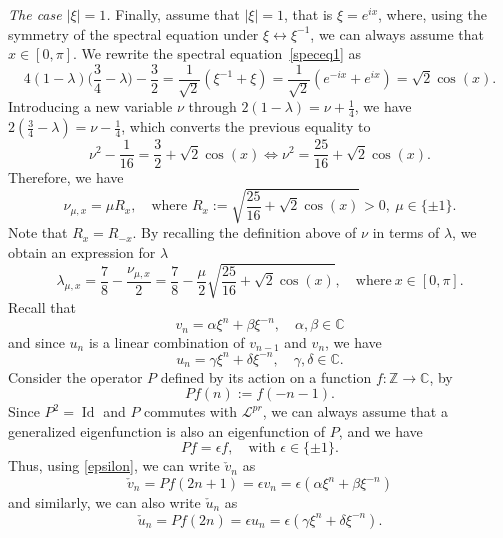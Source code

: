 \documentclass[11pt]{amsart}
\newcommand{\Z}{\mathbb{Z}}
\newcommand{\C}{\mathbb{C}}
\theoremstyle{definition}
\theoremstyle{remark}
\theoremstyle{plain}
\numberwithin{equation}{section}
\numberwithin{lemma}{section}
\numberwithin{definition}{section}
\numberwithin{proposition}{section}
\numberwithin{corollary}{section}
\numberwithin{theorem}{section}
\numberwithin{remark}{section}
\begin{document}
\vskip 0.3cm
{\it The case $\vert \xi \vert=1$.}
Finally, assume that $\vert \xi \vert=1$, that is $\xi=e^{ix}$, where, using the symmetry of the spectral equation under $\xi \leftrightarrow \xi^{-1}$, we can always assume that $x\in[0,\pi]$. We rewrite the spectral equation~\eqref{speceq1} as 
$$
4(1-\lambda)\Big(\frac{3}{4}-\lambda\Big)-\frac{3}{2}=\frac{1}{\sqrt{2}}(\xi^{-1}+\xi)=\frac{1}{\sqrt{2}}(e^{-ix}+e^{ix})=\sqrt{2}\cos(x).
$$
Introducing a new variable $\nu$ through $2(1-\lambda)=\nu+\frac{1}{4}$, we have $2(\frac{3}{4}-\lambda)=\nu-\frac{1}{4}$, which converts the previous equality to
\begin{equation}\label{mu1}
 \nu^2-\frac{1}{16}=\frac{3}{2}+\sqrt{2}\cos(x)
\iff
\nu^2=\frac{25}{16}+\sqrt{2}\cos(x).
\end{equation}
Therefore, we have 
\begin{equation}
 \nu_{\mu,x}=\mu R_x, \quad \text{where } R_x:=\sqrt{\frac{25}{16}+\sqrt{2}\cos(x)}>0, \ \mu\in\{\pm 1\}.
\end{equation}
Note that $R_x=R_{-x}$. By recalling the definition above of $\nu$ in terms of $\lambda$, we obtain an expression for $\lambda$
$$
\lambda_{\mu,x}=\frac{7}{8}-\frac{\nu_{\mu,x}}{2}=\frac{7}{8}-\frac{\mu}{2}\sqrt{\frac{25}{16}+\sqrt{2}\cos(x)}, \quad \text{where} \ x\in[0,\pi].
$$
Recall that 
\begin{equation}\label{newv}
 v_n=\alpha \xi^n + \beta \xi^{-n}, \quad \alpha,\beta\in\C
\end{equation}
and since $u_n$ is a linear combination of $v_{n-1}$ and $v_n$, we have
\begin{equation}\label{newu}
 u_n=\gamma \xi^n + \delta \xi^{-n}, \quad \gamma,\delta\in\C.
\end{equation}
Consider the operator $P$ defined by its action on a function $f:\Z \to \C$, by 
$$
Pf(n):=f(-n-1).
$$
Since $P^2=\operatorname{Id}$ and $P$ commutes with $\mathcal{L}^{pr}$, we can always assume that a generalized eigenfunction is also an eigenfunction of $P$, and we have 
\begin{equation}
 Pf=\epsilon f, \quad \text{with } \epsilon\in\{\pm1\}. \label{epsilon}
\end{equation}
Thus, using \eqref{epsilon}, we can write $\check{v}_n$ as
\begin{equation}\label{nov}
\check{v}_n=Pf(2n+1)=\epsilon v_n=\epsilon(\alpha \xi^n + \beta \xi^{-n})
\end{equation}
and similarly, we can also write $\check{u}_n$ as
\begin{equation}\label{nou}
\check{u}_n=Pf(2n)=\epsilon u_n=\epsilon(\gamma \xi^n + \delta \xi^{-n}).
\end{equation}
\end{document}
